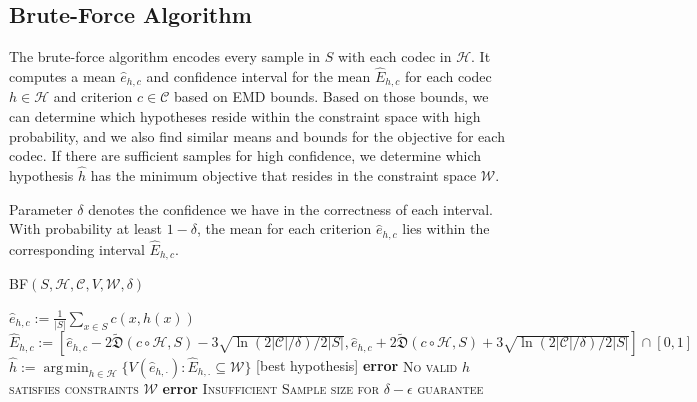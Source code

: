 \documentclass{article}
\newcommand{\md}{\mathfrak{D}}
\newcommand{\emd}{\tilde{\md}}
\DeclareMathOperator*{\argmin}{arg\,min}
\begin{document}
{\subsection{Brute-Force Algorithm}\label{brute-force}

The brute-force algorithm encodes every sample in $S$ with each codec in $\mathcal{H}$. It computes a mean $\hat{e}_{h,c}$ and confidence interval for the mean $\hat{E}_{h,c}$ for each codec $h \in \mathcal{H}$ and criterion $c \in \mathcal{C}$ based on EMD bounds. Based on those bounds, we can determine which hypotheses reside within the constraint space with high probability, and we also find similar means and bounds for the objective for each codec. If there are sufficient samples for high confidence, we determine which hypothesis $\hat{h}$ has the minimum objective that resides in the constraint space $\mathcal{W}$.

Parameter $\delta$ denotes the confidence we have in the correctness of each interval. With probability at least $1 - \delta$, the mean for each criterion $\hat{e}_{h,c}$ lies within the corresponding interval $\hat{E}_{h,c}$.

\begin{algorithm}
    \caption{BF$(S, \mathcal{H}, \mathcal{C}, V, \mathcal{W}, \delta)$}\label{euclid}
    \begin{algorithmic}[1]
            \State $\hat{e}_{h, c} := \frac{1}{|S|} \sum_{x \in S} c(x, h(x))$
            \State $\hat{E}_{h, c} := [\hat{e}_{h,c} - 2 \emd(c \circ \mathcal{H}, S) - 3\sqrt{\ln(2 |\mathcal{C}| / \delta) / 2|S|}, \hat{e}_{h,c} + 2 \emd(c \circ \mathcal{H}, S) + 3\sqrt{\ln(2 |\mathcal{C}| / \delta) / 2|S|}] \cap [0,1]$
        \EndFor
        $\hat{h} := \argmin_{h \in \mathcal{H}} \{V(\hat{e}_{h,\cdot}): \hat{E}_{h, .} \subseteq \mathcal{W} \}$ [best hypothesis] 
            \State \textbf{error} \textsc{No valid $h$ satisfies constraints $\mathcal{W}$}
            \State \textbf{error} \textsc{Insufficient Sample size for $\delta-\epsilon$ guarantee}
        \Else 
        \EndIf
        

\end{algorithmic}
\end{algorithm}}
\end{document}
